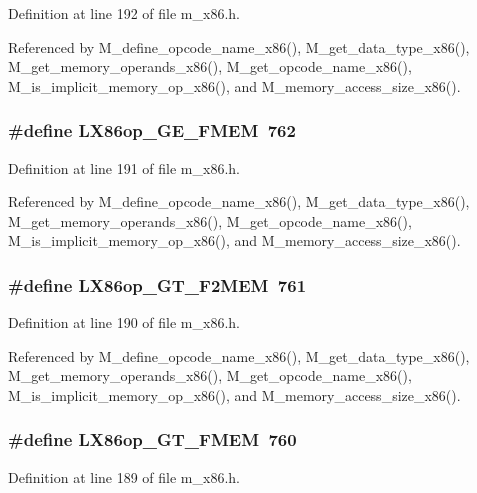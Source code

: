 Definition at line 192 of file m\_\-x86.h.

Referenced by M\_\-define\_\-opcode\_\-name\_\-x86(), M\_\-get\_\-data\_\-type\_\-x86(), M\_\-get\_\-memory\_\-operands\_\-x86(), M\_\-get\_\-opcode\_\-name\_\-x86(), M\_\-is\_\-implicit\_\-memory\_\-op\_\-x86(), and M\_\-memory\_\-access\_\-size\_\-x86().
\subsubsection{\setlength{\rightskip}{0pt plus 5cm}\#define LX86op\_\-GE\_\-FMEM~762}\label{m__x86_8h_402b6f3a3228f850e1d1bd4f0a735ebd}




Definition at line 191 of file m\_\-x86.h.

Referenced by M\_\-define\_\-opcode\_\-name\_\-x86(), M\_\-get\_\-data\_\-type\_\-x86(), M\_\-get\_\-memory\_\-operands\_\-x86(), M\_\-get\_\-opcode\_\-name\_\-x86(), M\_\-is\_\-implicit\_\-memory\_\-op\_\-x86(), and M\_\-memory\_\-access\_\-size\_\-x86().
\subsubsection{\setlength{\rightskip}{0pt plus 5cm}\#define LX86op\_\-GT\_\-F2MEM~761}\label{m__x86_8h_3e5f9ca8240836341837c86f6648864b}




Definition at line 190 of file m\_\-x86.h.

Referenced by M\_\-define\_\-opcode\_\-name\_\-x86(), M\_\-get\_\-data\_\-type\_\-x86(), M\_\-get\_\-memory\_\-operands\_\-x86(), M\_\-get\_\-opcode\_\-name\_\-x86(), M\_\-is\_\-implicit\_\-memory\_\-op\_\-x86(), and M\_\-memory\_\-access\_\-size\_\-x86().
\subsubsection{\setlength{\rightskip}{0pt plus 5cm}\#define LX86op\_\-GT\_\-FMEM~760}\label{m__x86_8h_0f8e410aebecbd7ae5318186a9e16062}




Definition at line 189 of file m\_\-x86.h.

